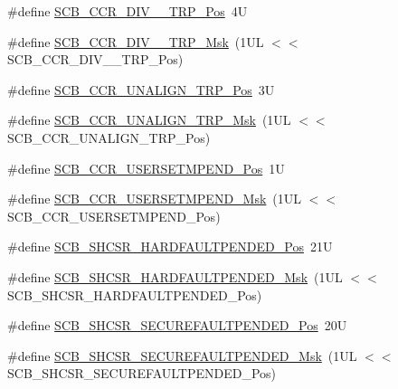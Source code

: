 \begin{DoxyCompactItemize}
\item 
\#define \mbox{\hyperlink{group___c_m_s_i_s___s_c_b_gac8d512998bb8cd9333fb7627ddf59bba}{S\+C\+B\+\_\+\+C\+C\+R\+\_\+\+D\+I\+V\+\_\+\_\+\+T\+R\+P\+\_\+\+Pos}}~4U
\item 
\#define \mbox{\hyperlink{group___c_m_s_i_s___s_c_b_gabb9aeac71b3abd8586d0297070f61dcb}{S\+C\+B\+\_\+\+C\+C\+R\+\_\+\+D\+I\+V\+\_\+\_\+\+T\+R\+P\+\_\+\+Msk}}~(1\+U\+L $<$$<$ S\+C\+B\+\_\+\+C\+C\+R\+\_\+\+D\+I\+V\+\_\+\_\+\+T\+R\+P\+\_\+\+Pos)
\item 
\#define \mbox{\hyperlink{group___c_m_s_i_s___s_c_b_gac4e4928b864ea10fc24dbbc57d976229}{S\+C\+B\+\_\+\+C\+C\+R\+\_\+\+U\+N\+A\+L\+I\+G\+N\+\_\+\+T\+R\+P\+\_\+\+Pos}}~3U
\item 
\#define \mbox{\hyperlink{group___c_m_s_i_s___s_c_b_ga68c96ad594af70c007923979085c99e0}{S\+C\+B\+\_\+\+C\+C\+R\+\_\+\+U\+N\+A\+L\+I\+G\+N\+\_\+\+T\+R\+P\+\_\+\+Msk}}~(1\+U\+L $<$$<$ S\+C\+B\+\_\+\+C\+C\+R\+\_\+\+U\+N\+A\+L\+I\+G\+N\+\_\+\+T\+R\+P\+\_\+\+Pos)
\item 
\#define \mbox{\hyperlink{group___c_m_s_i_s___s_c_b_ga789e41f45f59a8cd455fd59fa7652e5e}{S\+C\+B\+\_\+\+C\+C\+R\+\_\+\+U\+S\+E\+R\+S\+E\+T\+M\+P\+E\+N\+D\+\_\+\+Pos}}~1U
\item 
\#define \mbox{\hyperlink{group___c_m_s_i_s___s_c_b_ga4cf59b6343ca962c80e1885710da90aa}{S\+C\+B\+\_\+\+C\+C\+R\+\_\+\+U\+S\+E\+R\+S\+E\+T\+M\+P\+E\+N\+D\+\_\+\+Msk}}~(1\+U\+L $<$$<$ S\+C\+B\+\_\+\+C\+C\+R\+\_\+\+U\+S\+E\+R\+S\+E\+T\+M\+P\+E\+N\+D\+\_\+\+Pos)
\item 
\#define \mbox{\hyperlink{group___c_m_s_i_s___s_c_b_ga2e86fa5b7279235de3a62839e3f147cb}{S\+C\+B\+\_\+\+S\+H\+C\+S\+R\+\_\+\+H\+A\+R\+D\+F\+A\+U\+L\+T\+P\+E\+N\+D\+E\+D\+\_\+\+Pos}}~21U
\item 
\#define \mbox{\hyperlink{group___c_m_s_i_s___s_c_b_gad72747c81f58f73f0610760529697297}{S\+C\+B\+\_\+\+S\+H\+C\+S\+R\+\_\+\+H\+A\+R\+D\+F\+A\+U\+L\+T\+P\+E\+N\+D\+E\+D\+\_\+\+Msk}}~(1\+U\+L $<$$<$ S\+C\+B\+\_\+\+S\+H\+C\+S\+R\+\_\+\+H\+A\+R\+D\+F\+A\+U\+L\+T\+P\+E\+N\+D\+E\+D\+\_\+\+Pos)
\item 
\#define \mbox{\hyperlink{group___c_m_s_i_s___s_c_b_ga39d60110521af453e9ae55f1a29d2ab4}{S\+C\+B\+\_\+\+S\+H\+C\+S\+R\+\_\+\+S\+E\+C\+U\+R\+E\+F\+A\+U\+L\+T\+P\+E\+N\+D\+E\+D\+\_\+\+Pos}}~20U
\item 
\#define \mbox{\hyperlink{group___c_m_s_i_s___s_c_b_ga504f2af763a6f491acaba1912d5fe702}{S\+C\+B\+\_\+\+S\+H\+C\+S\+R\+\_\+\+S\+E\+C\+U\+R\+E\+F\+A\+U\+L\+T\+P\+E\+N\+D\+E\+D\+\_\+\+Msk}}~(1\+U\+L $<$$<$ S\+C\+B\+\_\+\+S\+H\+C\+S\+R\+\_\+\+S\+E\+C\+U\+R\+E\+F\+A\+U\+L\+T\+P\+E\+N\+D\+E\+D\+\_\+\+Pos)
$$
\end{DoxyCompactItemize}
